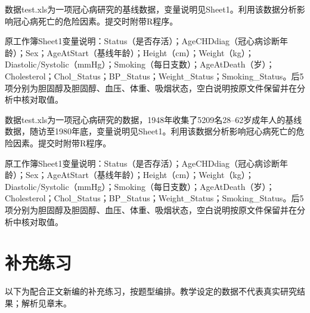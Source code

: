 \par\addvspace{8pt}\noindent\begin{minipage}{\linewidth}


数据test.xls为一项冠心病研究的基线数据，变量说明见Sheet1。利用该数据分析影响冠心病死亡的危险因素。提交时附带R程序。

原工作簿Sheet1变量说明：Status（是否存活）；AgeCHDdiag（冠心病诊断年龄）；Sex；AgeAtStart（基线年龄）；Height（cm）；Weight（kg）；Diastolic/Systolic（mmHg）；Smoking（每日支数）；AgeAtDeath（岁）；Cholesterol；Chol\_Status；BP\_Status；Weight\_Status；Smoking\_Status。后5项分别为胆固醇及胆固醇、血压、体重、吸烟状态，空白说明按原文件保留并在分析中核对取值。



\end{minipage}\par\vspace{5pt}

\par\addvspace{8pt}\noindent\begin{minipage}{\linewidth}


数据test.xls为一项冠心病研究的数据，1948年收集了5209名28--62岁成年人的基线数据，随访至1980年底，变量说明见Sheet1。利用该数据分析影响冠心病死亡的危险因素。提交时附带R程序。

原工作簿Sheet1变量说明：Status（是否存活）；AgeCHDdiag（冠心病诊断年龄）；Sex；AgeAtStart（基线年龄）；Height（cm）；Weight（kg）；Diastolic/Systolic（mmHg）；Smoking（每日支数）；AgeAtDeath（岁）；Cholesterol；Chol\_Status；BP\_Status；Weight\_Status；Smoking\_Status。后5项分别为胆固醇及胆固醇、血压、体重、吸烟状态，空白说明按原文件保留并在分析中核对取值。



\end{minipage}\par\vspace{5pt}


\clearpage\section{补充练习}

\begin{keyidea}[说明]以下为配合正文新编的补充练习，按题型编排。教学设定的数据不代表真实研究结果；解析见章末。\end{keyidea}

